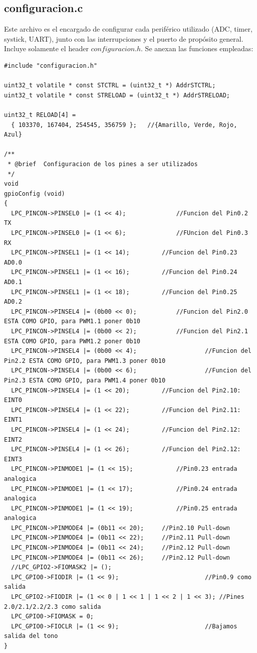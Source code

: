 \documentclass[paper=letter, fontsize=12pt]{article}
\begin{document}
 \clearpage
 
 \subsection{\textbf{configuracion.c}}
 Este archivo es el encargado de configurar cada periférico utilizado (ADC, timer, systick, UART), junto con las interrupciones y el puerto de propósito general. \\
 Incluye solamente el header $configuracion.h$. Se anexan las funciones empleadas:\\
 
 \begin{lstlisting}[style=CStyle]
#include "configuracion.h"

uint32_t volatile * const STCTRL = (uint32_t *) AddrSTCTRL;
uint32_t volatile * const STRELOAD = (uint32_t *) AddrSTRELOAD;

uint32_t RELOAD[4] =
  { 103370, 167404, 254545, 356759 };	//{Amarillo, Verde, Rojo, Azul}

/**
 * @brief  Configuracion de los pines a ser utilizados
 */
void
gpioConfig (void)
{
  LPC_PINCON->PINSEL0 |= (1 << 4);				//Funcion del Pin0.2	TX
  LPC_PINCON->PINSEL0 |= (1 << 6);				//FUncion del Pin0.3	RX
  LPC_PINCON->PINSEL1 |= (1 << 14);			//Funcion del Pin0.23  AD0.0
  LPC_PINCON->PINSEL1 |= (1 << 16);			//Funcion del Pin0.24  AD0.1
  LPC_PINCON->PINSEL1 |= (1 << 18);			//Funcion del Pin0.25  AD0.2
  LPC_PINCON->PINSEL4 |= (0b00 << 0);			//Funcion del Pin2.0 ESTA COMO GPIO, para PWM1.1 poner 0b10
  LPC_PINCON->PINSEL4 |= (0b00 << 2);			//Funcion del Pin2.1 ESTA COMO GPIO, para PWM1.2 poner 0b10
  LPC_PINCON->PINSEL4 |= (0b00 << 4);	                //Funcion del Pin2.2 ESTA COMO GPIO, para PWM1.3 poner 0b10
  LPC_PINCON->PINSEL4 |= (0b00 << 6);	     	        //Funcion del Pin2.3 ESTA COMO GPIO, para PWM1.4 poner 0b10
  LPC_PINCON->PINSEL4 |= (1 << 20);			//Funcion del Pin2.10: EINT0
  LPC_PINCON->PINSEL4 |= (1 << 22);			//Funcion del Pin2.11: EINT1
  LPC_PINCON->PINSEL4 |= (1 << 24);			//Funcion del Pin2.12: EINT2
  LPC_PINCON->PINSEL4 |= (1 << 26);			//Funcion del Pin2.12: EINT3
  LPC_PINCON->PINMODE1 |= (1 << 15);			//Pin0.23 entrada analogica
  LPC_PINCON->PINMODE1 |= (1 << 17);			//Pin0.24 entrada analogica
  LPC_PINCON->PINMODE1 |= (1 << 19);			//Pin0.25 entrada analogica
  LPC_PINCON->PINMODE4 |= (0b11 << 20);		//Pin2.10 Pull-down
  LPC_PINCON->PINMODE4 |= (0b11 << 22);		//Pin2.11 Pull-down
  LPC_PINCON->PINMODE4 |= (0b11 << 24);		//Pin2.12 Pull-down
  LPC_PINCON->PINMODE4 |= (0b11 << 26);		//Pin2.12 Pull-down
  //LPC_GPIO2->FIOMASK2 |= ();
  LPC_GPIO0->FIODIR |= (1 << 9);						//Pin0.9 como salida
  LPC_GPIO2->FIODIR |= (1 << 0 | 1 << 1 | 1 << 2 | 1 << 3);	//Pines 2.0/2.1/2.2/2.3 como salida
  LPC_GPIO0->FIOMASK = 0;
  LPC_GPIO0->FIOCLR |= (1 << 9);						//Bajamos salida del tono
}


\end{lstlisting}
\end{document}
